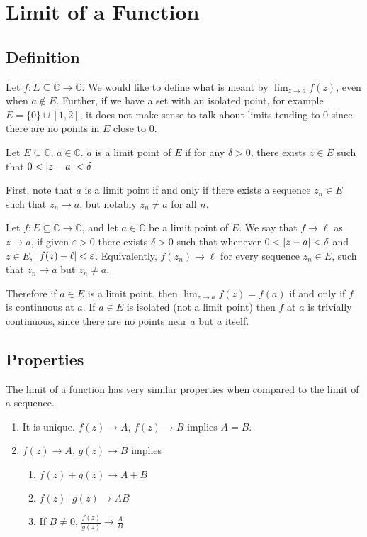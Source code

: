 \documentclass{article}
\begin{document}
\section{Limit of a Function}
\subsection{Definition}
Let $f \colon E \subseteq \mathbb C \to \mathbb C$. We would like to define what is meant by $\lim_{z \to a} f(z)$, even when $a \notin E$. Further, if we have a set with an isolated point, for example $E = \{ 0 \} \cup [1, 2]$, it does not make sense to talk about limits tending to 0 since there are no points in $E$ close to 0.
\begin{definition}
    Let $E \subseteq \mathbb C,\, a \in \mathbb C$. $a$ is a limit point of $E$ if for any $\delta > 0$, there exists $z \in E$ such that $0 < \abs{z - a} < \delta$.
\end{definition}
\noindent First, note that $a$ is a limit point if and only if there exists a sequence $z_n \in E$ such that $z_n \to a$, but notably $z_n \neq a$ for all $n$.
\begin{definition}
    Let $f \colon E \subseteq \mathbb C \to \mathbb C$, and let $a \in \mathbb C$ be a limit point of $E$. We say that $f \to \ell$ as $z \to a$, if given $\varepsilon > 0$ there exists $\delta > 0$ such that whenever $0 < \abs{z - a} < \delta$ and $z \in E$, $\abs{f(z) - \ell} < \varepsilon$. Equivalently, $f(z_n) \to \ell$ for every sequence $z_n \in E$, such that $z_n \to a$ but $z_n \neq a$.
\end{definition}
\noindent Therefore if $a \in E$ is a limit point, then $\lim_{z \to a} f(z) = f(a)$ if and only if $f$ is continuous at $a$. If $a \in E$ is isolated (not a limit point) then $f$ at $a$ is trivially continuous, since there are no points near $a$ but $a$ itself.

\subsection{Properties}
The limit of a function has very similar properties when compared to the limit of a sequence.
\begin{enumerate}
    \item It is unique. $f(z) \to A$, $f(z) \to B$ implies $A = B$.
    \item $f(z) \to A$, $g(z) \to B$ implies
          \begin{enumerate}
              \item $f(z) + g(z) \to A + B$
              \item $f(z)\cdot g(z) \to AB$
              \item If $B \neq 0$, $\frac{f(z)}{g(z)} \to \frac{A}{B}$
          \end{enumerate}
\end{enumerate}
\end{document}
